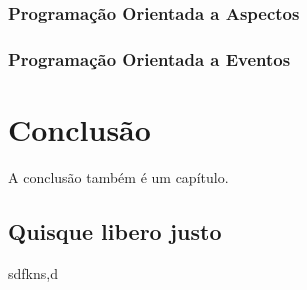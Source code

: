 \documentclass[tcc/ec]{faeng}
\begin{document}
\subsection{Programação Orientada a Aspectos}

\subsection{Programação Orientada a Eventos}


\chapter[Conclusão]{Conclusão}
A conclusão também é um capítulo.

\postextual




\begin{apendicesenv}
\partapendices %
\chapter{Quisque libero justo} %



sdfkns,d
\lipsum[1-5]
\end{apendicesenv}
\end{document}
